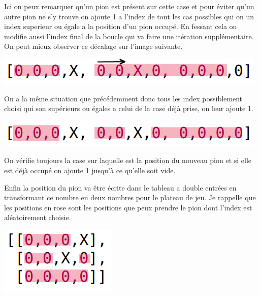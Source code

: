 Ici on peux remarquer qu'un pion est présent sur cette case et pour éviter qu'un autre pion ne s'y trouve on ajoute 1 a l'index de tout les cas possibles qui on un index superieur ou égale a la position d'un pion occupé. En fessant cela on modifie aussi l'index final de la boucle qui va faire une itération supplémentaire. On peut mieux observer ce décalage sur l'image suivante.

\begin{center}
\includegraphics[width=\textwidth]{image/Plateau jeu en ligne choix nombre direction 2.png} 
\end{center}

On a la même situation que précédemment donc tous les index possiblement choisi qui son supérieurs ou égales a celui de la case déjà prise, on leur ajoute 1.

\begin{center}
\includegraphics[width=\textwidth]{image/Plateau jeu en ligne choix nombre direction 3.png} 
\end{center}

On vérifie toujours la case sur laquelle est la position du nouveau pion et si elle est déjà occupé on ajoute 1 jusqu’à ce qu'elle soit vide.

Enfin la position du pion va être écrite dans le tableau a double entrées en transformant ce nombre en deux nombres pour le plateau de jeu.
Je rappelle que les positions en rose sont les positions que peux prendre le pion dont l'index est aléatoirement choisie.

\begin{center}
\includegraphics[scale=0.75]{image/Plateau jeu normal final.png}
\end{center}